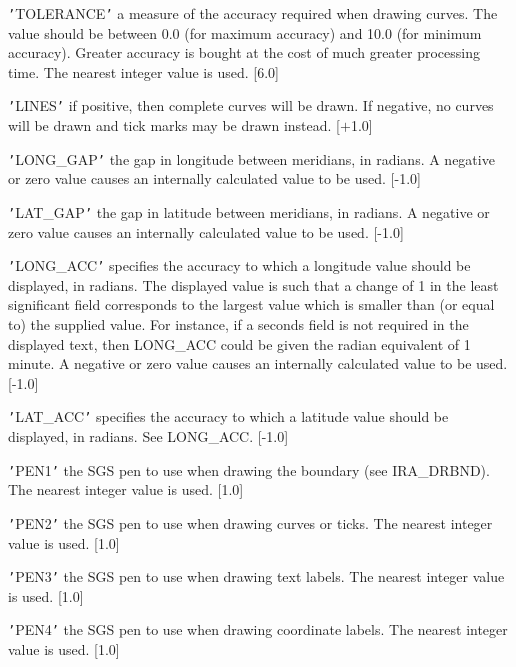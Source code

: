 {{{         \sstitem
         {\tt '}TOLERANCE{\tt '}  a measure of the accuracy required when drawing
         curves. The value should be between 0.0 (for maximum accuracy)
         and 10.0 (for minimum accuracy). Greater accuracy is bought at the
         cost of much greater processing time. The nearest integer value
         is used. [6.0]

         \sstitem
         {\tt '}LINES{\tt '}  if positive, then complete curves will be drawn. If
         negative, no curves will be drawn and tick marks may be drawn
         instead. [$+$1.0]

         \sstitem
         {\tt '}LONG\_GAP{\tt '}  the gap in longitude between meridians, in radians.
         A negative or zero value causes an internally calculated value to
         be used. [-1.0]

         \sstitem
         {\tt '}LAT\_GAP{\tt '}  the gap in latitude between meridians, in radians.
         A negative or zero value causes an internally calculated value to
         be used. [-1.0]

         \sstitem
         {\tt '}LONG\_ACC{\tt '}  specifies the accuracy to which a longitude value
         should be displayed, in radians.  The displayed value is such that
         a change of 1 in the least significant field corresponds to the
         largest value which is smaller than (or equal to) the supplied
         value. For instance, if a seconds field is not required in the
         displayed text, then LONG\_ACC could be given the radian equivalent
         of 1 minute. A negative or zero value causes an internally
         calculated value to be used. [-1.0]

         \sstitem
         {\tt '}LAT\_ACC{\tt '}  specifies the accuracy to which a latitude value
         should be displayed, in radians. See LONG\_ACC. [-1.0]

         \sstitem
         {\tt '}PEN1{\tt '}  the SGS pen to use when drawing the boundary (see
         IRA\_DRBND). The nearest integer value is used. [1.0]

         \sstitem
         {\tt '}PEN2{\tt '}  the SGS pen to use when drawing curves or ticks. The
         nearest integer value is used. [1.0]

         \sstitem
         {\tt '}PEN3{\tt '}  the SGS pen to use when drawing text labels. The
         nearest integer value is used. [1.0]

         \sstitem
         {\tt '}PEN4{\tt '}  the SGS pen to use when drawing coordinate labels. The
         nearest integer value is used. [1.0]
      }
   }
}
